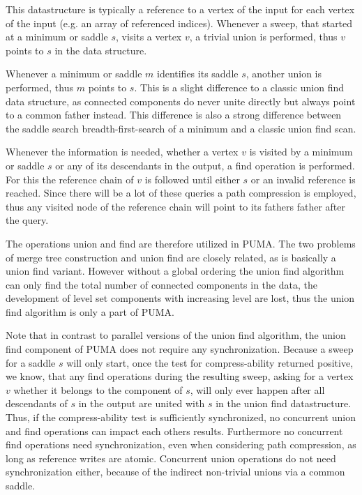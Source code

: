 \documentclass[%
	paper=A4,					%
	twoside=true,				%
	openright,					%
	parskip=full,				%
	chapterprefix=true,			%
	11pt,						%
	headings=normal,			%
	bibliography=totoc,			%
	listof=totoc,				%
	titlepage=on,				%
	captions=tableabove,		%
	draft=false,				%
]{scrreprt}%
\begin{document}
This datastructure is typically a reference to a vertex of the input for each vertex of the input (e.g. an array of referenced indices). Whenever a sweep, that started at a minimum or saddle \(s\), visits a vertex \(v\), a trivial union is performed, thus \(v\) points to \(s\) in the data structure. 

Whenever a minimum or saddle \(m\) identifies its saddle \(s\), another union is performed, thus \(m\) points to \(s\). This is a slight difference to a classic union find data structure, as connected components do never unite directly but always point to a common father instead. This difference is also a strong difference between the saddle search breadth-first-search of a minimum and a classic union find scan.

Whenever the information is needed, whether a vertex \(v\) is visited by a minimum or saddle \(s\) or any of its descendants in the output, a find operation is performed. For this the reference chain of \(v\) is followed until either \(s\) or an invalid reference is reached. Since there will be a lot of these queries a path compression is employed, thus any visited node of the reference chain will point to its fathers father after the query.

The operations union and find are therefore utilized in PUMA. The two problems of merge tree construction and union find are closely related, as \cite{pascucci1} is basically a union find variant. However without a global ordering the union find algorithm can only find the total number of connected components in the data, the development of level set components with increasing level are lost, thus the union find algorithm is only a part of PUMA.

Note that in contrast to parallel versions of the union find algorithm, the union find component of PUMA does not require any synchronization. Because a sweep for a saddle \(s\) will only start, once the test for compress-ability returned positive, we know, that any find operations during the resulting sweep, asking for a vertex \(v\) whether it belongs to the component of \(s\), will only ever happen after all descendants of \(s\) in the output are united with \(s\) in the union find datastructure. Thus, if the compress-ability test is sufficiently synchronized, no concurrent union and find operations can impact each others results. Furthermore no concurrent find operations need synchronization, even when considering path compression, as long as reference writes are atomic. Concurrent union operations do not need synchronization either, because of the indirect non-trivial unions via a common saddle.
\end{document}
